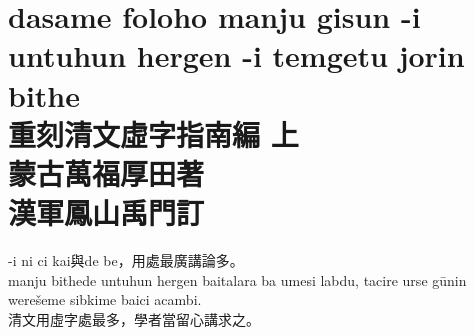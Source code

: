 \documentclass{article}
\begin{document}


\section{dasame foloho manju gisun -i untuhun hergen -i temgetu jorin bithe\\重刻清文虛字指南編 上\\\large{蒙古\;萬福厚田\;著\\
漢軍\;鳳山禹門\;訂}}
\noindent -i ni ci kai與de be，用處最廣講論多。\\
\noindent manju bithede untuhun hergen baitalara ba umesi labdu, tacire urse g\={u}nin were\v{s}eme sibkime baici acambi.\\
\noindent 清文用虛字處最多，學者當留心講求之。\\
\end{document}
